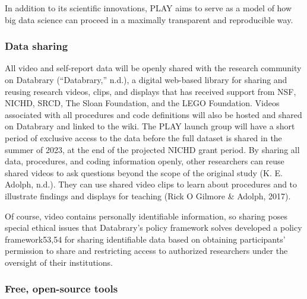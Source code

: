 \documentclass[english,man]{apa6}
\theoremstyle{definition}
\theoremstyle{definition}
\theoremstyle{definition}
\theoremstyle{remark}
\begin{document}
In addition to its scientific innovations, PLAY aims to serve as a model
of how big data science can proceed in a maximally transparent and
reproducible way.

\subsubsection{Data sharing}\label{data-sharing}

All video and self-report data will be openly shared with the research
community on Databrary (``Databrary,'' n.d.), a digital web-based
library for sharing and reusing research videos, clips, and displays
that has received support from NSF, NICHD, SRCD, The Sloan Foundation,
and the LEGO Foundation. Videos associated with all procedures and code
definitions will also be hosted and shared on Databrary and linked to
the wiki. The PLAY launch group will have a short period of exclusive
access to the data before the full dataset is shared in the summer of
2023, at the end of the projected NICHD grant period. By sharing all
data, procedures, and coding information openly, other researchers can
reuse shared videos to ask questions beyond the scope of the original
study (K. E. Adolph, n.d.). They can use shared video clips to learn
about procedures and to illustrate findings and displays for teaching
(Rick O Gilmore \& Adolph, 2017).

Of course, video contains personally identifiable information, so
sharing poses special ethical issues that Databrary's policy framework
solves developed a policy framework53,54 for sharing identifiable data
based on obtaining participants' permission to share and restricting
access to authorized researchers under the oversight of their
institutions.

\subsubsection{Free, open-source tools}\label{free-open-source-tools}
\end{document}
